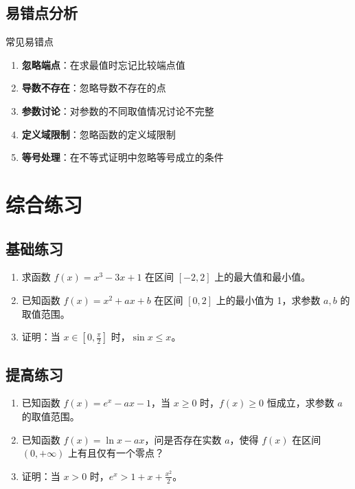 \documentclass[a4paper,12pt]{ctexrep}
\begin{document}
\section{易错点分析}

\begin{warningbox}{常见易错点}
\begin{enumerate}
    \item \textbf{忽略端点}：在求最值时忘记比较端点值
    \item \textbf{导数不存在}：忽略导数不存在的点
    \item \textbf{参数讨论}：对参数的不同取值情况讨论不完整
    \item \textbf{定义域限制}：忽略函数的定义域限制
    \item \textbf{等号处理}：在不等式证明中忽略等号成立的条件
\end{enumerate}
\end{warningbox}

\chapter{综合练习}

\section{基础练习}

\begin{enumerate}
    \item 求函数 $f(x) = x^3 - 3x + 1$ 在区间 $[-2, 2]$ 上的最大值和最小值。
    \item 已知函数 $f(x) = x^2 + ax + b$ 在区间 $[0, 2]$ 上的最小值为 1，求参数 $a, b$ 的取值范围。
    \item 证明：当 $x \in [0, \frac{\pi}{2}]$ 时，$\sin x \leq x$。
\end{enumerate}

\section{提高练习}

\begin{enumerate}
    \item 已知函数 $f(x) = e^x - ax - 1$，当 $x \geq 0$ 时，$f(x) \geq 0$ 恒成立，求参数 $a$ 的取值范围。
    \item 已知函数 $f(x) = \ln x - ax$，问是否存在实数 $a$，使得 $f(x)$ 在区间 $(0, +\infty)$ 上有且仅有一个零点？
    \item 证明：当 $x > 0$ 时，$e^x > 1 + x + \frac{x^2}{2}$。
\end{enumerate}
\end{document}

